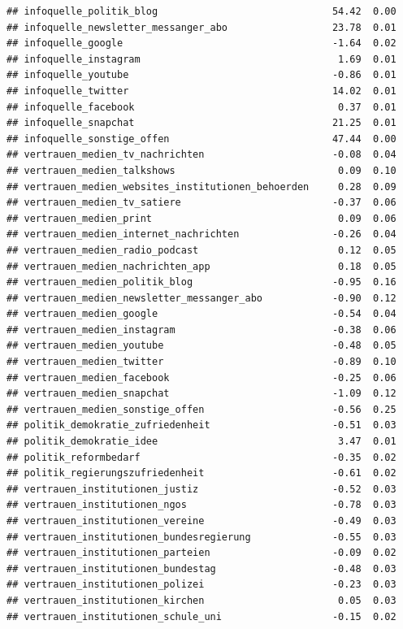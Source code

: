 \documentclass[
]{book}
\begin{document}
\begin{verbatim}
## infoquelle_politik_blog                              54.42  0.00
## infoquelle_newsletter_messanger_abo                  23.78  0.01
## infoquelle_google                                    -1.64  0.02
## infoquelle_instagram                                  1.69  0.01
## infoquelle_youtube                                   -0.86  0.01
## infoquelle_twitter                                   14.02  0.01
## infoquelle_facebook                                   0.37  0.01
## infoquelle_snapchat                                  21.25  0.01
## infoquelle_sonstige_offen                            47.44  0.00
## vertrauen_medien_tv_nachrichten                      -0.08  0.04
## vertrauen_medien_talkshows                            0.09  0.10
## vertrauen_medien_websites_institutionen_behoerden     0.28  0.09
## vertrauen_medien_tv_satiere                          -0.37  0.06
## vertrauen_medien_print                                0.09  0.06
## vertrauen_medien_internet_nachrichten                -0.26  0.04
## vertrauen_medien_radio_podcast                        0.12  0.05
## vertrauen_medien_nachrichten_app                      0.18  0.05
## vertrauen_medien_politik_blog                        -0.95  0.16
## vertrauen_medien_newsletter_messanger_abo            -0.90  0.12
## vertrauen_medien_google                              -0.54  0.04
## vertrauen_medien_instagram                           -0.38  0.06
## vertrauen_medien_youtube                             -0.48  0.05
## vertrauen_medien_twitter                             -0.89  0.10
## vertrauen_medien_facebook                            -0.25  0.06
## vertrauen_medien_snapchat                            -1.09  0.12
## vertrauen_medien_sonstige_offen                      -0.56  0.25
## politik_demokratie_zufriedenheit                     -0.51  0.03
## politik_demokratie_idee                               3.47  0.01
## politik_reformbedarf                                 -0.35  0.02
## politik_regierungszufriedenheit                      -0.61  0.02
## vertrauen_institutionen_justiz                       -0.52  0.03
## vertrauen_institutionen_ngos                         -0.78  0.03
## vertrauen_institutionen_vereine                      -0.49  0.03
## vertrauen_institutionen_bundesregierung              -0.55  0.03
## vertrauen_institutionen_parteien                     -0.09  0.02
## vertrauen_institutionen_bundestag                    -0.48  0.03
## vertrauen_institutionen_polizei                      -0.23  0.03
## vertrauen_institutionen_kirchen                       0.05  0.03
## vertrauen_institutionen_schule_uni                   -0.15  0.02

\end{verbatim}
\end{document}
